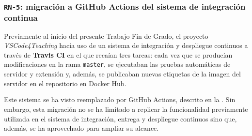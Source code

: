 \subsubsection{\texttt{RN-5}: migración a GitHub Actions del sistema de integración continua}
\label{subsec:rn5}

Previamente al inicio del presente Trabajo Fin de Grado, el proyecto \textit{VSCode4Teaching} hacía uso de un sistema de integración y despliegue continuos a través de \textbf{Travis CI} en el que recaían tres tareas: cada vez que se producían modificaciones en la rama \texttt{master}, se ejecutaban las pruebas automáticas de servidor y extensión y, además, se publicaban nuevas etiquetas de la imagen del servidor en el repositorio en Docker Hub.

Este sistema se ha visto reemplazado por GitHub Actions, descrito en la . Sin embargo, esta migración no se ha limitado a replicar la funcionalidad previamente utilizada en el sistema de integración, entrega y despliegue continuos sino que, además, se ha aprovechado para ampliar su alcance.

